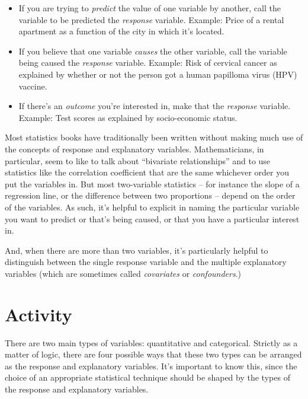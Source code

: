 \documentclass[nofonts,]{tufte-handout}
\providecommand{\tightlist}{%
  \setlength{\itemsep}{0pt}\setlength{\parskip}{0pt}}
\begin{document}
\begin{itemize}
\tightlist
\item
  If you are trying to \emph{predict} the value of one variable by
  another, call the variable to be predicted the \emph{response}
  variable. Example: Price of a rental apartment as a function of the
  city in which it's located.
\item
  If you believe that one variable \emph{causes} the other variable,
  call the variable being caused the \emph{response} variable. Example:
  Risk of cervical cancer as explained by whether or not the person got
  a human papilloma virus (HPV) vaccine.
\item
  If there's an \emph{outcome} you're interested in, make that the
  \emph{response} variable. Example: Test scores as explained by
  socio-economic status.
\end{itemize}

Most statistics books have traditionally been written without making
much use of the concepts of response and explanatory variables.
Mathematicians, in particular, seem to like to talk about ``bivariate
relationships'' and to use statistics like the correlation coefficient
that are the same whichever order you put the variables in. But most
two-variable statistics -- for instance the slope of a regression line,
or the difference between two proportions -- depend on the order of the
variables. As such, it's helpful to explicit in naming the particular
variable you want to predict or that's being caused, or that you have a
particular interest in.

And, when there are more than two variables, it's particularly helpful
to distinguish between the single response variable and the multiple
explanatory variables (which are sometimes called \emph{covariates} or
\emph{confounders}.)

\hypertarget{activity}{%
\section{Activity}\label{activity}}

There are two main types of variables: quantitative and categorical.
Strictly as a matter of logic, there are four possible ways that these
two types can be arranged as the response and explanatory variables.
It's important to know this, since the choice of an appropriate
statistical technique should be shaped by the types of the response and
explanatory variables.
\end{document}
